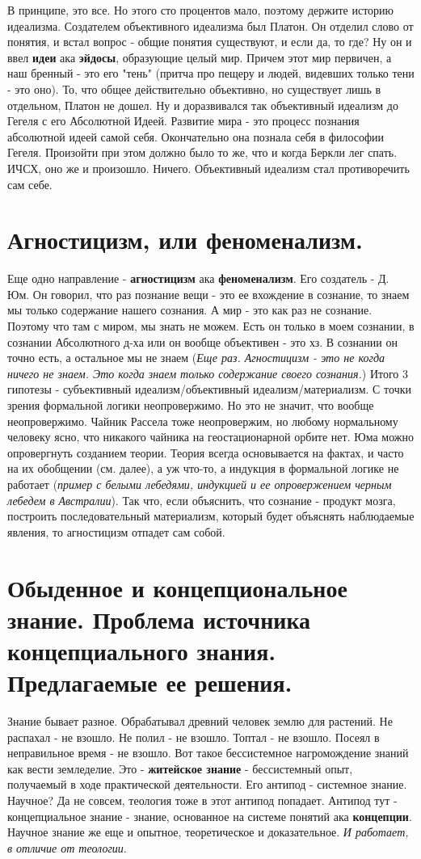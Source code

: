 В принципе, это все. Но этого сто процентов мало, поэтому держите историю идеализма. Создателем объективного идеализма был Платон. Он отделил слово от понятия, и встал вопрос - общие понятия существуют, и если да, то где? Ну он и ввел \textbf{идеи} ака \textbf{эйдосы}, образующие целый мир. Причем этот мир первичен, а наш бренный - это его "тень" (притча про пещеру и людей, видевших только тени - это оно). То, что общее действительно объективно, но существует лишь в отдельном, Платон не дошел. Ну и доразвивался так объективный идеализм до Гегеля с его Абсолютной Идеей. Развитие мира - это процесс познания абсолютной идеей самой себя. Окончательно она познала себя в философии Гегеля. Произойти при этом должно было то же, что и когда Беркли лег спать. ИЧСХ, оно же и произошло. Ничего. Объективный идеализм стал противоречить сам себе.

\section{ Агностицизм, или феноменализм.}
Еще одно направление - \textbf{агностицизм} ака \textbf{феноменализм}. Его создатель - Д. Юм. Он говорил, что раз познание вещи - это ее вхождение в сознание, то знаем мы только содержание нашего сознания. А мир - это как раз не сознание. Поэтому что там с миром, мы знать не можем. Есть он только в моем сознании, в сознании Абсолютного д-ха или он вообще объективен - это хз. В сознании он точно есть, а остальное мы не знаем (\textit{Еще раз. Агностицизм - это не когда ничего не знаем. Это когда знаем только содержание своего сознания.}) Итого 3 гипотезы - субъективный идеализм/объективный идеализм/материализм. С точки зрения формальной логики неопровержимо. Но это не значит, что вообще неопровержимо. Чайник Рассела тоже неопровержим, но любому нормальному человеку ясно, что никакого чайника на геостационарной орбите нет. Юма можно опровергнуть созданием теории. Теория всегда основывается на фактах, и часто на их обобщении (см. далее), а уж что-то, а индукция в формальной логике не работает (\textit{пример с белыми лебедями, индукцией и ее опровержением черным лебедем в Австралии}). Так что, если объяснить, что сознание - продукт мозга, построить последовательный материализм, который будет объяснять наблюдаемые явления, то агностицизм отпадет сам собой.

\section{ Обыденное и концепциональное знание. Проблема источника концепциального знания. Предлагаемые ее решения.}
Знание бывает разное. Обрабатывал древний человек землю для растений. Не распахал - не взошло. Не полил - не взошло. Топтал - не взошло. Посеял в неправильное время - не взошло. Вот такое бессистемное нагромождение знаний как вести земледелие. Это - \textbf{житейское знание} - бессистемный опыт, получаемый в ходе практической деятельности. Его антипод - системное знание. Научное? Да не совсем, теология тоже в этот антипод попадает. Антипод тут - концепциальное знание - знание, основанное на системе понятий ака \textbf{концепции}. Научное знание же еще и опытное, теоретическое и доказательное. \textit{И работает, в отличие от теологии}.

